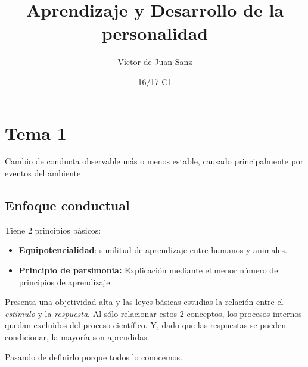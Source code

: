 \documentclass[palatino,nochap]{apuntesURJC}
\title{Aprendizaje y Desarrollo de la personalidad}
\author{Víctor de Juan Sanz}
\date{16/17 C1}
\begin{document}
\pagestyle{plain}
\maketitle

\tableofcontents
\newpage

\section{Tema 1}

\begin{defn}[Aprendizaje]
Cambio de conducta observable más o menos
estable, causado principalmente por eventos del
ambiente
\end{defn}

\subsection{Enfoque conductual}

Tiene 2 principios básicos:
\begin{itemize}
	\item \textbf{Equipotencialidad}: similitud de aprendizaje entre humanos y animales.
	\item \textbf{Principio de parsimonia:} Explicación mediante el menor número de principios de aprendizaje.
\end{itemize}

Presenta una objetividad alta y las leyes básicas estudias la relación entre el \textit{estímulo} y la \textit{respuesta}. 
%
Al sólo relacionar estos 2 conceptos, los procesos internos quedan excluidos del proceso científico.
%
Y, dado que las respuestas se pueden condicionar, la mayoría son aprendidas.


\begin{defn}
Pasando de definirlo porque todos lo conocemos.
\end{defn}
\end{document}
